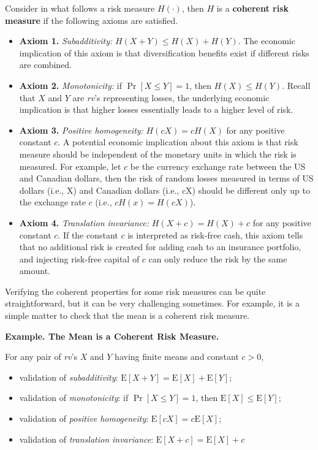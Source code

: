 \documentclass[]{book}
\providecommand{\tightlist}{%
  \setlength{\itemsep}{0pt}\setlength{\parskip}{0pt}}
\theoremstyle{definition}
\theoremstyle{definition}
\theoremstyle{definition}
\theoremstyle{remark}
\begin{document}
Consider in what follows a risk measure \(H(\cdot)\), then \(H\) is a
\textbf{coherent risk measure} if the following axioms are satisfied.

\begin{itemize}
\tightlist
\item
  \textbf{Axiom 1.} \emph{Subadditivity:} \(H(X+Y)\leq H(X)+H(Y)\). The
  economic implication of this axiom is that diversification benefits
  exist if different risks are combined.\\
\item
  \textbf{Axiom 2.} \emph{Monotonicity:} if \(\Pr[X\leq Y]=1\), then
  \(H(X)\leq H(Y)\). Recall that \(X\) and \(Y\) are \emph{rv}'s
  representing losses, the underlying economic implication is that
  higher losses essentially leads to a higher level of risk.\\
\item
  \textbf{Axiom 3.} \emph{Positive homogeneity:} \(H(cX)=cH(X)\) for any
  positive constant \(c\). A potential economic implication about this
  axiom is that risk measure should be independent of the monetary units
  in which the risk is measured. For example, let \(c\) be the currency
  exchange rate between the US and Canadian dollars, then the risk of
  random losses measured in terms of US dollars (i.e., X) and Canadian
  dollars (i.e., cX) should be different only up to the exchange rate
  \(c\) (i.e., \(cH(x)=H(cX)\)).\\
\item
  \textbf{Axiom 4.} \emph{Translation invariance:} \(H(X+c)=H(X)+c\) for
  any positive constant \(c\). If the constant \(c\) is interpreted as
  risk-free cash, this axiom tells that no additional risk is created
  for adding cash to an insurance portfolio, and injecting risk-free
  capital of \(c\) can only reduce the risk by the same amount.
\end{itemize}

Verifying the coherent properties for some risk measures can be quite
straightforward, but it can be very challenging sometimes. For example,
it is a simple matter to check that the mean is a coherent risk measure.

\textbf{Example. The Mean is a Coherent Risk Measure.}

For any pair of \emph{rv}'s \(X\) and \(Y\) having finite means and
constant \(c>0\),

\begin{itemize}
\tightlist
\item
  validation of \emph{subadditivity}:
  \(\mathrm{E}[X+Y]=\mathrm{E}[X]+\mathrm{E}[Y]\);
\item
  validation of \emph{monotonicity}: if \(\Pr[X\leq Y]=1\), then
  \(\mathrm{E}[X]\leq \mathrm{E}[Y]\);
\item
  validation of \emph{positive homogeneity}:
  \(\mathrm{E}[cX]=c\mathrm{E}[X]\);
\item
  validation of \emph{translation invariance}:
  \(\mathrm{E}[X+c]=\mathrm{E}[X]+c\)
\end{itemize}
\end{document}
